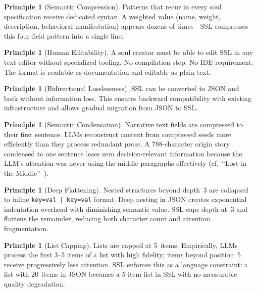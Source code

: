 \documentclass[12pt,a4paper]{article}
\theoremstyle{plain}
\theoremstyle{definition}
\newtheorem{principle}[theorem]{Principle}
\theoremstyle{remark}
\begin{document}
\begin{principle}[Semantic Compression]
Patterns that recur in every soul specification receive dedicated syntax. A weighted value (name, weight, description, behavioral manifestation) appears dozens of times---SSL compresses this four-field pattern into a single line.
\end{principle}

\begin{principle}[Human Editability]
A soul creator must be able to edit SSL in any text editor without specialized tooling. No compilation step. No IDE requirement. The format is readable as documentation and editable as plain text.
\end{principle}

\begin{principle}[Bidirectional Losslessness]
SSL can be converted to JSON and back without information loss. This ensures backward compatibility with existing infrastructure and allows gradual migration from JSON to SSL.
\end{principle}

\begin{principle}[Semantic Condensation]
Narrative text fields are compressed to their first sentence. LLMs reconstruct context from compressed seeds more efficiently than they process redundant prose. A 788-character origin story condensed to one sentence loses zero decision-relevant information because the LLM's attention was never using the middle paragraphs effectively (cf.\ ``Lost in the Middle''~\cite{liu2023}).
\end{principle}

\begin{principle}[Deep Flattening]
Nested structures beyond depth~3 are collapsed to inline \texttt{key=val | key=val} format. Deep nesting in JSON creates exponential indentation overhead with diminishing semantic value. SSL caps depth at~3 and flattens the remainder, reducing both character count and attention fragmentation.
\end{principle}

\begin{principle}[List Capping]
Lists are capped at 5~items. Empirically, LLMs process the first 3--5 items of a list with high fidelity; items beyond position~5 receive progressively less attention. SSL enforces this as a language constraint: a list with 20~items in JSON becomes a 5-item list in SSL with no measurable quality degradation.
\end{principle}
\end{document}
